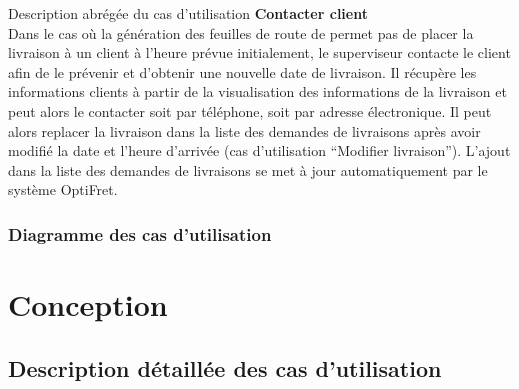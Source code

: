 \documentclass[a4paper]{report}
\begin{document}
Description abrégée du cas d’utilisation \textbf{Contacter client}\\

Dans le cas où la génération des feuilles de route de permet pas de placer la
livraison à un client à l’heure prévue initialement, le superviseur contacte
le client afin de le prévenir et d’obtenir une nouvelle date de livraison. Il
récupère les informations clients à partir de la visualisation des
informations de la livraison et peut alors le contacter soit par téléphone,
soit par adresse électronique. Il peut alors replacer la livraison dans la
liste des demandes de livraisons après avoir modifié la date et l’heure
d’arrivée (cas d’utilisation “Modifier livraison”). L’ajout dans la liste des
demandes de livraisons se met à jour automatiquement par le système
OptiFret.\\


\subsection{Diagramme des cas d'utilisation}


\chapter{Conception}

\section{Description détaillée des cas d'utilisation}
\end{document}
